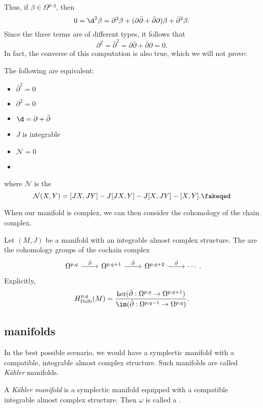 \documentclass[a4paper]{article}
\newcommand\Dolb{\mathrm{Dolb}}
\begin{document}
Thus, if $\beta \in \Omega^{p, q}$, then
\[
  0 = \d^2 \beta = \partial^2 \beta + (\partial \bar{\partial} + \bar{\partial} \partial) \beta + \bar{\partial}^2 \beta.
\]
Since the three terms are of different types, it follows that
\[
  \partial^2 = \bar{\partial}^2 = \partial\bar{\partial} + \bar{\partial}\partial = 0.
\]
In fact, the converse of this computation is also true, which we will not prove:
\begin{thm}
  The following are equivalent:
  \begin{multicols}{2}
    \begin{itemize}
      \item $\bar{\partial}^2 = 0$
      \item $\partial^2 = 0$
      \item $\d = \partial + \bar{\partial}$
      \item $J$ is integrable
      \item $\mathcal{N} = 0$
      \item[ ]
    \end{itemize}
  \end{multicols}
  where $\mathcal{N}$ is the 
  \[
    \mathcal{N}(X, Y) = [JX, JY] - J[JX, Y] - J[X, JY] - [X, Y].\fakeqed
  \]
\end{thm}

When our manifold is complex, we can then consider the cohomology of the chain complex.
\begin{defi}
  Let $(M, J)$ be a manifold with an integrable almost complex structure. The  are the cohomology groups of the cochain complex
  \[
    \begin{tikzcd}
      \Omega^{p, q} \ar[r, "\bar{\partial}"] &
      \Omega^{p, q + 1} \ar[r, "\bar{\partial}"] &
      \Omega^{p, q + 2} \ar[r, "\bar{\partial}"] &
      \cdots
    \end{tikzcd}.
  \]
  Explicitly,
  \[
    H^{p, q}_{\Dolb} (M) = \frac{\ker(\bar{\partial}: \Omega^{p, q} \to \Omega^{p, q + 1})}{\im (\bar{\partial}: \Omega^{p, q - 1} \to \Omega^{p, q})}.
  \]
\end{defi}

\subsection{ manifolds}
In the best possible scenario, we would have a symplectic manifold with a compatible, integrable almost complex structure. Such manifolds are called \emph{K\"ahler} manifolds.
\begin{defi}
  A \emph{K\"ahler manifold} is a symplectic manifold equipped with a compatible integrable almost complex structure. Then $\omega$ is called a .
\end{defi}
\end{document}
